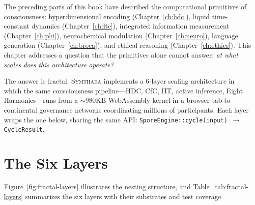 \documentclass[12pt]{book}
\newcommand{\symthaea}{\textsc{Symthaea}}
\begin{document}
The preceding parts of this book have described the computational primitives of consciousness: hyperdimensional encoding (Chapter~\ref{ch:hdc}), liquid time-constant dynamics (Chapter~\ref{ch:ltc}), integrated information measurement (Chapter~\ref{ch:phi}), neurochemical modulation (Chapter~\ref{ch:neuro}), language generation (Chapter~\ref{ch:broca}), and ethical reasoning (Chapter~\ref{ch:ethics}). This chapter addresses a question that the primitives alone cannot answer: \textit{at what scales does this architecture operate?}

The answer is fractal. \symthaea{} implements a 6-layer scaling architecture in which the same consciousness pipeline---HDC, CfC, IIT, active inference, Eight Harmonies---runs from a ${\sim}980$KB WebAssembly kernel in a browser tab to continental governance networks coordinating millions of participants. Each layer wraps the one below, sharing the same API: \texttt{SporeEngine::cycle(input) $\to$ CycleResult}.

\section{The Six Layers}

Figure~\ref{fig:fractal-layers} illustrates the nesting structure, and Table~\ref{tab:fractal-layers} summarizes the six layers with their substrates and test coverage.
\end{document}
